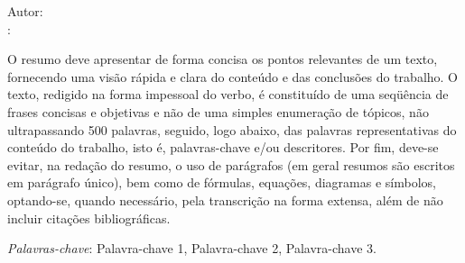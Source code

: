 \begin{center}
  {\Large{\textbf{\imprimirtitulo}}}
\end{center}

\vspace{1cm}

\begin{flushright}
  Autor: \imprimirautor\\
  \imprimirorientadorRotulo:~\imprimirorientador
\end{flushright}

\vspace{1cm}

\begin{resumo}[RESUMO]
  O resumo deve apresentar de forma concisa os pontos relevantes de um texto, fornecendo uma visão rápida e clara do conteúdo e das conclusões do trabalho. O texto, redigido na forma impessoal do verbo, é constituído de uma seqüência de frases concisas e objetivas e não de uma simples enumeração de tópicos, não ultrapassando 500 palavras, seguido, logo abaixo, das palavras representativas do conteúdo do trabalho, isto é, palavras-chave e/ou descritores. Por fim, deve-se evitar, na redação do resumo, o uso de parágrafos (em geral resumos são escritos em parágrafo único), bem como de fórmulas, equações, diagramas e símbolos, optando-se, quando necessário, pela transcrição na forma extensa, além de não incluir citações bibliográficas.
  \vspace{\onelineskip}

  \noindent
  \textit{Palavras-chave}: Palavra-chave 1, Palavra-chave 2, Palavra-chave 3.
\end{resumo}